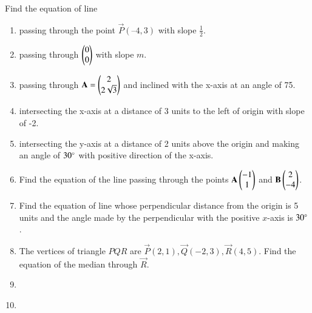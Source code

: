 Find the equation of line 
\begin{enumerate}[label=\thesection.\arabic*,ref=\thesection.\theenumi]
	\item passing through the point $\vec{P}(– 4, 3)$ with slope $\frac{1}{2}$.
\label{chapters/11/10/2/2}
\\
\solution

	\item passing through $\begin{pmatrix}0\\0\end{pmatrix}$ with slope $m$.\\
\label{chapters/11/10/2/3}
\solution

    \item passing through 
    $\mathbf{A} = \begin{pmatrix}2\\2\sqrt{3}\end{pmatrix}$ and inclined with the x-axis at an angle 
    of 75\textdegree.
\label{chapters/11/10/2/4}
\\
    \solution 

\item intersecting the x-axis at a distance of 3 units to the left of origin with slope of -2.
\label{chapters/11/10/2/5}
\\
\solution 

\item intersecting the y-axis at a distance of 2 units above the origin and making an
angle of $30\degree$ with positive direction of the x-axis.
\\
\solution 

\item Find the equation of the line passing through the points $\mathbf{A}\begin{pmatrix}-1\\1\end{pmatrix}$ and $\mathbf{B}\begin{pmatrix}2\\-4\end{pmatrix}$.
\\
\solution 

\item Find the equation of line whose perpendicular distance from the origin is 5 units and the angle made by the perpendicular with the positive $x$-axis is $30\degree$.
\label{chapters/11/10/2/8}
\\
\solution

\item 
The vertices of triangle $PQR$ are $\vec{P}(2,1), \vec{Q}(-2,3), \vec{R}(4,5)$. Find the equation of the median through $\vec{R}$.
\label{chapters/11/10/2/9}
\\
\solution

\item 
\label{chapters/11/10/2/10}
%
\item 
\label{chapters/11/10/2/11}

\end{enumerate}
